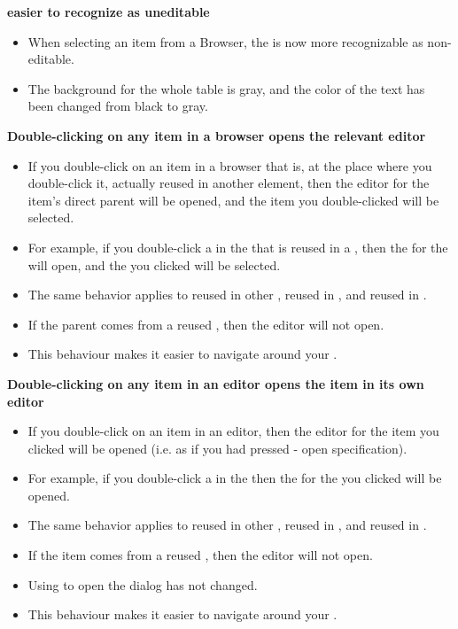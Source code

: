 \textbf{\gdpropview{} easier to recognize as uneditable}\\
\begin{itemize}
\item When selecting an item from a Browser, the \gdpropview{} is now more recognizable as non-editable.
\item The background for the whole table is gray, and the color of the text has been changed from black to gray.
\end{itemize}

\textbf{Double-clicking on any item in a browser opens the relevant editor}
\begin{itemize}
\item If you double-click on an item in a browser that is, at the place where you double-click it, actually reused in another element, then the editor for the item's direct parent will be opened, and the item you double-clicked will be selected. 
\item For example, if you double-click a \gdcase{} in the \gdtestsuitebrowser{} that is reused in a \gdsuite{}, then the \gdtestsuiteeditor{} for the \gdsuite{} will open, and the \gdcase{} you clicked will be selected.
\item The same behavior applies to \gdcases{} reused in other \gdcases{}, \gdsuites{} reused in \gdjobs{}, and \gdehandlers{} reused in \gdcases{}. 
\item If the parent comes from a reused \gdproject{}, then the editor will not open.
\item This behaviour makes it easier to navigate around your \gdproject{}. 
\end{itemize}

\textbf{Double-clicking on any item in an editor opens the item in its own editor}
\begin{itemize}
\item If you double-click on an item in an editor, then the editor for the item you clicked will be opened (i.e. as if you had pressed  - open specification). 
\item For example, if you double-click a \gdcase{} in the \gdtestsuitebrowser{} then the \gdtestcaseeditor{} for the \gdcase{} you clicked will be opened.
\item The same behavior applies to \gdcases{} reused in other \gdcases{}, \gdsuites{} reused in \gdjobs{}, and \gdehandlers{} reused in \gdcases{}. 
\item If the item comes from a reused \gdproject{}, then the editor will not open.
\item Using  to open the  dialog has not changed.
\item This behaviour makes it easier to navigate around your \gdproject{}. 
\end{itemize}

